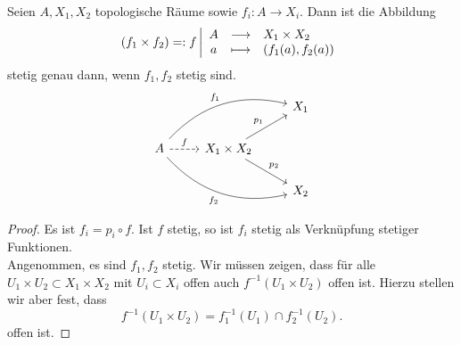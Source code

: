 \begin{theorem}\label{thm:universelle-eigenschaft-endliches-produkt}
    Seien $A,X_1,X_2$ topologische Räume sowie $f_i: A \to  X_i$. Dann ist die Abbildung
        \begin{equation*}
            (f_1\times f_2) =: f \left| \begin{array}{c c l} 
        A & \longrightarrow & X_1\times X_2 \\
        a & \longmapsto &  (f_1(a),f_2(a))
        \end{array} \right.
    \end{equation*}
    stetig genau dann, wenn $f_1,f_2$ stetig sind. 
    \[
    \begin{tikzcd}
        & & X_1 \\
        A \ar[dashed]{r}{f} \ar[bend left = 30]{rru}{f_1} \ar[swap, bend right = 30]{rrd}{f_2} & X_1\times X_2 \ar{ur}{p_1} \ar{dr}{p_2} \\
                                                                              & & X_2
    \end{tikzcd}
\]
\end{theorem}
\begin{proof}
    Es ist $f_i = p_i \circ  f$. Ist $f$ stetig, so ist  $f_i$ stetig als Verknüpfung stetiger Funktionen. \\
    Angenommen, es sind $f_1,f_2$ stetig. Wir müssen zeigen, dass für alle $U_1\times U_2\subset X_1\times X_2$ mit $U_i\subset X_i$ offen auch $f^{-1}(U_1\times U_2)$ offen ist. Hierzu stellen wir aber fest, dass
    \[
        f^{-1}(U_1\times U_2) = f_1^{-1}(U_1) \cap  f_2^{-1}(U_2)
    .\] 
    offen ist.
\end{proof}
